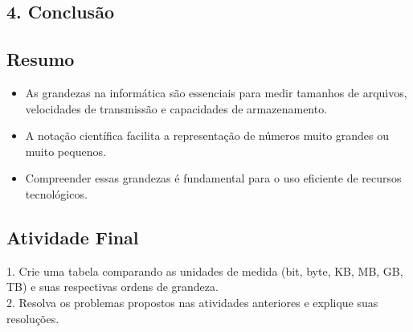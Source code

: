 \documentclass[11pt]{article}
\begin{document}
\begin{multicols}{2}
\section*{4. Conclusão}

\subsection*{Resumo}
\begin{itemize}
    \item As grandezas na informática são essenciais para medir tamanhos de arquivos, velocidades de transmissão e capacidades de armazenamento.
    \item A notação científica facilita a representação de números muito grandes ou muito pequenos.
    \item Compreender essas grandezas é fundamental para o uso eficiente de recursos tecnológicos.
\end{itemize}

\subsection*{Atividade Final}
1. Crie uma tabela comparando as unidades de medida (bit, byte, KB, MB, GB, TB) e suas respectivas ordens de grandeza. \\
2. Resolva os problemas propostos nas atividades anteriores e explique suas resoluções.

\end{multicols}
\end{document}
